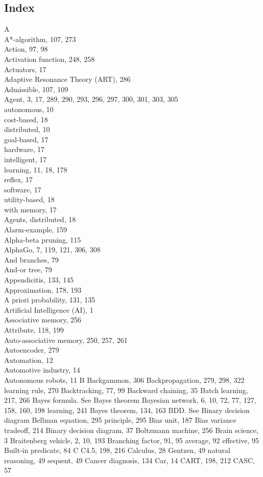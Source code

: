 \documentclass[10pt]{book}
\begin{document}
\begin{center}
\subsection{Index}
A\\
A*-algorithm, 107, 273\\
Action, 97, 98\\
Activation function, 248, 258\\
Actuators, 17\\
Adaptive Resonance Theory (ART), 286\\
Admissible, 107, 109\\
Agent, 3, 17, 289, 290, 293, 296, 297, 300, 301, 303, 305\\
autonomous, 10\\
cost-based, 18\\
distributed, 10\\
goal-based, 17\\
hardware, 17\\
intelligent, 17\\
learning, 11, 18, 178\\
reflex, 17\\
software, 17\\
utility-based, 18\\
with memory, 17\\
Agents, distributed, 18\\
Alarm-example, 159\\
Alpha-beta pruning, 115\\
AlphaGo, 7, 119, 121, 306, 308\\
And branches, 79\\
And-or tree, 79\\
Appendicitis, 133, 145\\
Approximation, 178, 193\\
A priori probability, 131, 135\\
Artificial Intelligence (AI), 1\\
Associative memory, 256\\
Attribute, 118, 199\\
Auto-associative memory, 250, 257, 261\\
Autoencoder, 279\\
Automation, 12\\
Automotive industry, 14\\
Autonomous robots, 11
B
Backgammon, 306
Backpropagation, 279, 298, 322
learning rule, 270
Backtracking, 77, 99
Backward chaining, 35
Batch learning, 217, 266
Bayes formula. See Bayes theorem
Bayesian network, 6, 10, 72, 77, 127, 158, 160, 198
learning, 241
Bayes theorem, 134, 163
BDD. See Binary decision diagram
Bellman
equation, 295
principle, 295
Bias unit, 187
Bias variance tradeoff, 214
Binary decision diagram, 37
Boltzmann machine, 256
Brain science, 3
Braitenberg vehicle, 2, 10, 193
Branching factor, 91, 95
average, 92
effective, 95
Built-in predicate, 84
C
C4.5, 198, 216
Calculus, 28
Gentzen, 49
natural reasoning, 49
sequent, 49
Cancer diagnosis, 134
Car, 14
CART, 198, 212
CASC, 57


\end{center}
\end{document}
